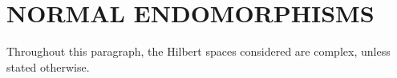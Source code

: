 \section{NORMAL ENDOMORPHISMS}

Throughout this paragraph, the Hilbert spaces considered are complex, unless stated otherwise.

